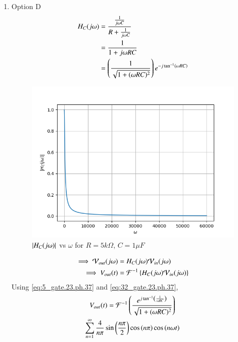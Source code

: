 \documentclass[journal,12pt,twocolumn]{IEEEtran}
\theoremstyle{remark}
\begin{document}
\begin{enumerate}
    \item Option D
    \begin{align}
        H_C(j\omega) &=  \frac{\frac{1}{j\omega C}}{R + \frac{1}{j\omega C}}\\
        &= \frac{1}{1+j\omega RC}\\
        &= \left(\frac{1}{\sqrt{1 + (\omega R C)^2}}\right)e^{-j\tan^{-1}\left(\omega RC\right)}\label{eq:32_gate.23.ph.37}
    \end{align}
    \begin{figure}[!h]
        \centering
        \includegraphics[width=\columnwidth]{figs/opt_d_hf.png}
        \caption{$\left\vert H_C(j\omega)\right\vert$ vs $\omega$ for $R=5k\Omega$, $C=1\mu F$}
        \label{fig:opt_d_hf_gate.ph.23.37}
    \end{figure}
    \newpage
    \begin{align}
        \implies \mathcal{V}_{out}(j\omega) &= H_C(j\omega)\mathcal{V}_{in}(j\omega)\\
        \implies V_{out}(t) &= \mathcal{F}^{-1}\left\{H_C(j\omega)\mathcal{V}_{in}(j\omega)\right\}
    \end{align}
    Using \eqref{eq:5_gate.23.ph.37} and \eqref{eq:32_gate.23.ph.37}, 
    \begin{multline}
    V_{out}(t)=\mathcal{F}^{-1}\left(\frac{e^{j\tan^{-1}\left(\frac{1}{\omega RC}\right)}}{\sqrt{1 + (\omega R C)^2}}\right)\\ \sum_{n = 1}^{\infty}\frac{4}{n\pi}\sin{\ensuremath{\left(\frac{n\pi}{2}\right)}}\cos\left({n\pi}\right) \cos{\ensuremath{\left(n\omega t\right)}}
    \end{multline}
    \begin{figure}[!h]
        \centering

\end{figure}
\end{enumerate}
\end{document}
